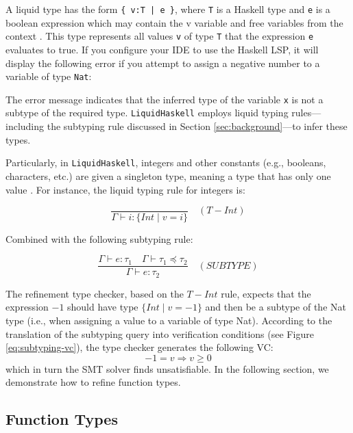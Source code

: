 \documentclass[]{rptuseminar}
\begin{document}
A liquid type has the form \texttt{\{ v:T | e \}}, where \texttt{T} is a Haskell type and \texttt{e} is a boolean expression
which may contain the v variable and free variables from the context \cite{vazou_refinement_2014}. This type represents all
values \texttt{v} of type \texttt{T} that the expression \texttt{e} evaluates to true.
If you configure your IDE to use the Haskell LSP, it will display the following error if you attempt to assign a negative 
number to a variable of type \texttt{Nat}:


The error message indicates that the inferred type of the variable \texttt{x} is not a subtype of the 
required type. \texttt{LiquidHaskell} employs liquid typing rules—including the subtyping rule 
discussed in Section \ref{sec:background}—to infer these types.

Particularly, in \texttt{LiquidHaskell}, integers and other constants (e.g., booleans, characters, etc.) are given a
singleton type, meaning a type that has only one value \cite{niki_lecture_2024}. For instance, the liquid typing rule for integers is:

\[
\frac{
}{
\Gamma \vdash i: \{Int \mid v = i\}
} 
\quad (\mathit{T-Int})
\]

Combined with the following subtyping rule:

\[
\frac{
 \Gamma \vdash e: \tau_1  \quad \Gamma \vdash \tau_1 \preceq \tau_2
}{
 \Gamma \vdash e: \tau_2 
}
\quad (\mathit{SUBTYPE})
\]

The refinement type checker, based on the \(\mathit{T-Int}\) rule, expects that the expression \(-1\) should have type \(\{Int \mid v = -1\}\) 
and then be a subtype of the Nat type (i.e., when assigning a value to a variable of type Nat). 
According to the translation of the subtyping query into verification conditions (see Figure \ref{eq:subtyping-vc}), 
the type checker generates the following VC:
\[
-1 = v \Rightarrow v \geq 0
\]
which in turn the SMT solver finds unsatisfiable. In the following section,
we demonstrate how to refine function types.

\subsection{Function Types}
\end{document}
